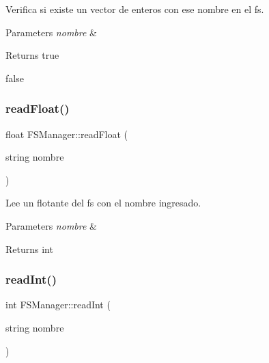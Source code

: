 Verifica si existe un vector de enteros con ese nombre en el fs. 


\begin{DoxyParams}{Parameters}
{\em nombre} & \\
\hline
\end{DoxyParams}
\begin{DoxyReturn}{Returns}
true 

false 
\end{DoxyReturn}
\mbox{\label{classFSManager_a5362f82406fa9501f3c5126987565dc1}} 
\subsubsection{\texorpdfstring{read\+Float()}{readFloat()}}
{\footnotesize\ttfamily float F\+S\+Manager\+::read\+Float (\begin{DoxyParamCaption}\item[{string}]{nombre }\end{DoxyParamCaption})\hspace{0.3cm}{\ttfamily [inline]}}



Lee un flotante del fs con el nombre ingresado. 


\begin{DoxyParams}{Parameters}
{\em nombre} & \\
\hline
\end{DoxyParams}
\begin{DoxyReturn}{Returns}
int 
\end{DoxyReturn}
\mbox{\label{classFSManager_a819ea57611717a89633a5b02cb4d0f10}} 
\subsubsection{\texorpdfstring{read\+Int()}{readInt()}}
{\footnotesize\ttfamily int F\+S\+Manager\+::read\+Int (\begin{DoxyParamCaption}\item[{string}]{nombre }\end{DoxyParamCaption})\hspace{0.3cm}{\ttfamily [inline]}}



